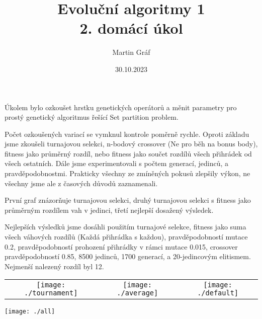 \documentclass[a4paper]{article}
\newenvironment{ukol}[2][]{\begin{trivlist} 
\item[\hskip \labelsep {\bfseries #1}\hskip \labelsep {\bfseries #2}]}{\end{trivlist}}
\begin{document}
 
 
\title{ Evoluční algoritmy 1 \\ 2. domácí úkol
        } 
\author{Martin Gráf}
\date{30.10.2023}

\maketitle

Úkolem bylo ozkoušet hrstku genetických operátorů a měnit parametry pro prostý genetický algoritmus řešící Set partition problem.

\begin{ukol}{Jednoduché}

Počet ozkoušených variací se vymknul kontrole poměrně rychle. Oproti základu jsme zkoušeli turnajovou selekci, n-bodový crossover (Ne pro běh na bonus body),
fitness jako průměrný rozdíl, nebo fitness jako součet rozdílů všech přihrádek od všech ostatních. Dále jsme experimentovali s počtem generací, jedinců, 
a pravděpodobnostmi. Prakticky všechny ze zmíněných pokusů zlepšily výkon, ne všechny jsme ale z časových důvodů zaznamenali.

První graf znázorňuje turnajovou selekci, druhý turnajovou selekci s fitness jako průměrným rozdílem vah v jedinci, třetí nejlepší dosažený výsledek.

Nejlepších výsledků jsme dosáhli použitím turnajové selekce, fitness jako suma všech váhových rozdílů (Každá přihrádka s každou), pravděpodobností mutace 0.2,
pravděpodobností prohození přihrádky v rámci mutace 0.015, crossover pravděpodobností 0.85, 8500 jedinců, 1700 generací, a 20-jedincovým elitismem. Nejmenší 
nalezený rozdíl byl 12.


\begin{center}
	\begin{tabular}{ c c c }
		\texttt{[image: ./tournament]} & \texttt{[image: ./average]} & \texttt{[image: ./default]}\\ 
	\end{tabular}
\end{center}
\texttt{[image: ./all]}

\end{ukol}
\end{document}
